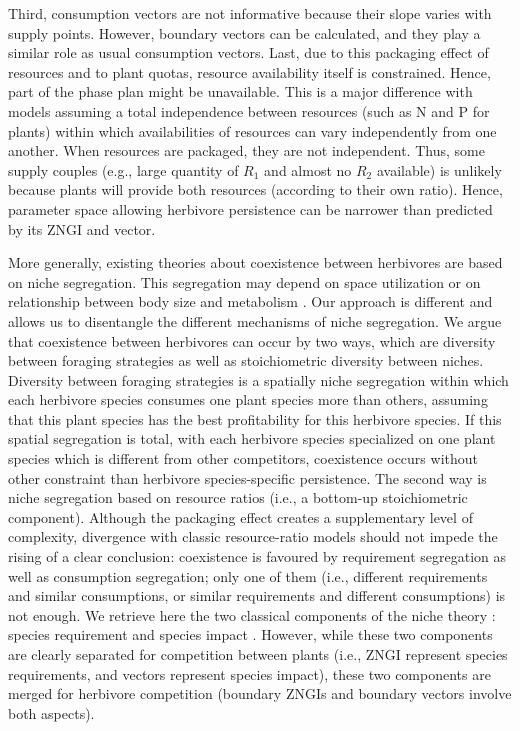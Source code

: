 \documentclass[12pt]{article}
\begin{document}
Third, consumption vectors are not informative because their slope varies with supply points. However, boundary vectors can be calculated, and they play a similar role as usual consumption vectors. 
Last, due to this packaging effect of resources and to plant quotas, resource availability itself is constrained. Hence, part of the phase plan might be unavailable. This is a major difference with models assuming a total independence between resources (such as N and P for plants) within which availabilities of resources can vary independently from one another. When resources are packaged, they are not independent. Thus, some supply couples (e.g., large quantity of $R_1$ and almost no $R_2$ available) is unlikely because plants will provide both resources (according to their own ratio).
Hence,  
parameter space allowing herbivore persistence can be narrower than predicted by its ZNGI and vector. \par
More generally, existing theories about coexistence between herbivores are based on niche segregation. This segregation may depend on space utilization or on relationship between body size and metabolism \citep{Owen-Smith1982}. Our approach is different and allows us to disentangle the different mechanisms of niche segregation. We argue that coexistence between herbivores can occur by two ways, which are  diversity between foraging strategies as well as stoichiometric diversity between niches. 
Diversity between foraging strategies is a spatially niche segregation within which each herbivore species consumes one plant species more than others, assuming that this plant species has the best profitability for this herbivore species. If this spatial segregation is total, with each herbivore species specialized on one plant species which is different from other competitors, coexistence occurs without other constraint than herbivore species-specific persistence. The second way is niche segregation based on resource ratios (i.e., a bottom-up stoichiometric component). 
Although the packaging effect creates a supplementary level of complexity, divergence with classic resource-ratio models should not impede the rising of a clear conclusion: coexistence is favoured by requirement segregation as well as consumption segregation; only one of them (i.e., different requirements and similar consumptions, or similar requirements and different consumptions) is not enough. We retrieve here the two classical components of the niche theory \citep{Chase2003}: species requirement \citep{Hutchinson1957} and species impact \citep{Elton1927, Macarthur1967}. However, while these two components are clearly separated for competition between plants (i.e., ZNGI represent species requirements, and vectors represent species impact), these two components are merged for herbivore competition (boundary ZNGIs and boundary vectors involve both aspects).  \par 
\end{document}
